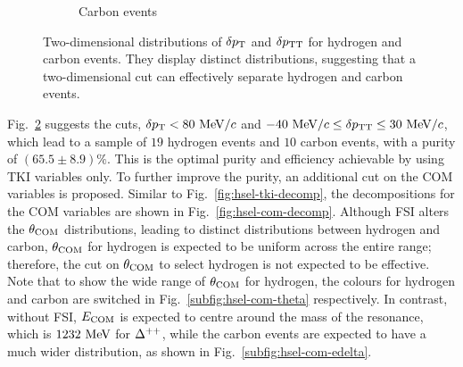 \begin{figure}
\begin{subfigure}[b]{\dbfigwid\textwidth}
               \caption{Carbon events}
               \label{subfig:hsel-dpt-dptt-c}
          \end{subfigure}
          \caption{Two-dimensional distributions of $\delta p_\textrm{T}$ and $\delta p_\textrm{TT}$ for hydrogen and carbon events.
          They display distinct distributions, suggesting that a two-dimensional cut can effectively separate hydrogen and carbon events.
          }
          \label{fig:hsel-dpt-dptt}
     \end{figure}

     Fig.~\ref{fig:hsel-dpt-dptt} suggests the cuts, $\delta p_\textrm{T} < 80~\textrm{MeV}/c$ and $-40~\textrm{MeV}/c \leq \delta p_\textrm{TT} \leq 30~\textrm{MeV}/c$, which lead to a sample of $19$ hydrogen events and $10$ carbon events, with a purity of $(65.5\pm8.9)\%$.
     This is the optimal purity and efficiency achievable by using TKI variables only.
     To further improve the purity, an additional cut on the COM variables is proposed.
     Similar to Fig.~\ref{fig:hsel-tki-decomp}, the decompositions for the COM variables are shown in Fig.~\ref{fig:hsel-com-decomp}.
     Although FSI alters the $\theta_{\textrm{COM}}$ distributions, leading to distinct distributions between hydrogen and carbon, $\theta_{\textrm{COM}}$ for hydrogen is expected to be uniform across the entire range; therefore, the cut on $\theta_{\textrm{COM}}$ to select hydrogen is not expected to be effective.
     Note that to show the wide range of $\theta_{\textrm{COM}}$ for hydrogen, the colours for hydrogen and carbon are switched in Fig.~\ref{subfig:hsel-com-theta} respectively.
     In contrast, without FSI, $E_{\textrm{COM}}$ is expected to centre around the mass of the resonance, which is $1232~\textrm{MeV}$ for $\Delta^{++}$, while the carbon events are expected to have a much wider distribution, as shown in Fig.~\ref{subfig:hsel-com-edelta}.
